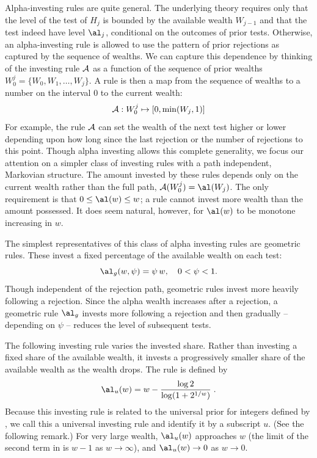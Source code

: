\documentclass[12pt]{article}
\begin{document}
 
 Alpha-investing rules are quite general.  The underlying theory requires only
 that the level of the test of $H_j$ is bounded by the available wealth
 $W_{j-1}$ and that the test indeed have level $\al_j$, conditional on the
 outcomes of prior tests.  Otherwise, an alpha-investing rule is allowed to use
 the pattern of prior rejections as captured by the sequence of wealths.  We can
 capture this dependence by thinking of the investing rule ${\cal A}$ as a
 function of the sequence of prior wealths $W_0^j = \{W_0, W_1, \ldots, W_j\}$.
  A rule is then a map from the sequence of wealths to a number on the interval
 0 to the current wealth:
 \begin{equation}
    {\cal A}: W_0^j \mapsto [0, \min(W_j,1)]    
 \label{eq:A}
 \end{equation}
 For example, the rule $\cal A$ can set the wealth of the next test higher or
 lower depending upon how long since the last rejection or the number of
 rejections to this point.  Though alpha investing allows this complete
 generality, we focus our attention on a simpler class of investing rules with a
 path independent, Markovian structure.  The amount invested by these rules
 depends only on the current wealth rather than the full path, ${\cal A}(W_0^j)
 = \al(W_j)$.  The only requirement is that $0 \le \al(w) \le w$; a rule cannot
 invest more wealth than the amount possessed.  It does seem natural, however,
 for $\al(w)$ to be monotone increasing in $w$.


 The simplest representatives of this class of alpha investing rules are
 geometric rules.  These invest a fixed percentage of the available wealth on
 each test:
 \begin{equation}
    \al_g(w, \psi) = \psi \, w, \quad  0 < \psi < 1.
 \label{eq:Ageo}
 \end{equation}
 Though independent of the rejection path, geometric rules invest more heavily
 following a rejection.  Since the alpha wealth increases after a rejection, a
 geometric rule $\al_g$ invests more following a rejection and then gradually --
 depending on $\psi$ -- reduces the level of subsequent tests.


 The following investing rule varies the invested share.  Rather than investing
 a fixed share of the available wealth, it invests a progressively smaller share
 of the available wealth as the wealth drops.  The rule is defined by
 \begin{equation}
   \al_u(w) = w - \frac{\log 2}{\log(1+2^{1/w})} \;.   
 \label{eq:Auniv}
 \end{equation}
 Because this investing rule is related to the universal prior for integers
 defined by \citet{rissanen83}, we call this a universal investing rule and
 identify it by a subscript $u$.  (See the following remark.)  For very large
 wealth, $\al_u(w)$ approaches $w$ (the limit of the second term in
  is $w-1$ as $w \rightarrow \infty$), and $\al_u(w)
 \rightarrow 0$ as $w \rightarrow 0$.
\end{document}
